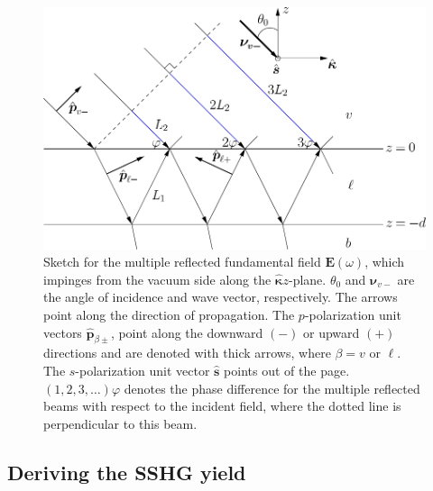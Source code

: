 \begin{figure}
\centering 
\includegraphics[scale=0.6]{content/figures/diag-3layer_MR_1w}
\caption{Sketch for the multiple reflected fundamental field
$\mathbf{E}(\omega)$, which impinges from the vacuum side along the
$\hat{\boldsymbol{\kappa}}z$-plane. $\theta_{0}$ and $\boldsymbol{\nu}_{v-}$ are
the angle of incidence and wave vector, respectively. The arrows point along the
direction of propagation. The $p$-polarization unit vectors
$\hat{\mathbf{p}}_{\beta\pm}$, point along the downward $(-)$ or upward $(+)$
directions and are denoted with thick arrows, where $\beta = v$ or $\ell$. The
$s$-polarization unit vector $\hat{\mathbf{s}}$ points out of the page.
$(1,2,3,\ldots)\varphi$ denotes the phase difference for the multiple reflected
beams with respect to the incident field, where the dotted line is perpendicular
to this beam.}
\label{fig:MR3layer1w}
\end{figure}



\subsection{Deriving the SSHG yield}

